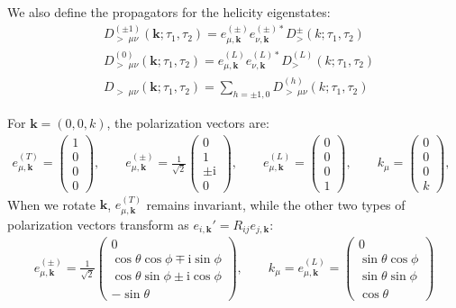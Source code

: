\documentclass[a4paper,12pt]{article}
\def\mb{\mathbf}
\begin{document}
We also define the propagators for the helicity eigenstates:
\begin{align}
    &D_{>\;\mu\nu}^{{(\pm1)}} \left(\mb k ; \tau_{1}, \tau_{2}\right) = e_{\mu,\mb k}^{(\pm) } e_{\nu, \mb k}^{(\pm)*} D_{>}^{\pm} \left(k ; \tau_{1}, \tau_{2}\right) \\
    &D_{>\;\mu\nu}^{{(0)}} \left(\mb k ; \tau_{1}, \tau_{2}\right) =  e_{\mu,\mb k}^{(L)} e_{\nu, \mb k}^{(L)*} D_{>}^{(L)}\left(k ; \tau_{1}, \tau_{2}\right) \\
    &D_{>\;\mu\nu}^{} \left(\mb k ; \tau_{1}, \tau_{2}\right) = \sum_{h=\pm1,0} D_{>\;\mu\nu}^{{(h)}} \left(k ; \tau_{1}, \tau_{2}\right)
\end{align}

For $\mb{k}=(0,0,k)$, the polarization vectors are:
\begin{align}
    e_{\mu,\mathbf{k}}^{(T)} = \begin{pmatrix} 1 \\ 0 \\ 0 \\ 0 \end{pmatrix} , \qquad
    e_{\mu,\mathbf{k}}^{(\pm)} = \frac{1}{\sqrt{2}} \begin{pmatrix} 0 \\ 1 \\ \pm \mathrm{i} \\ 0 \end{pmatrix} , \qquad
    e_{\mu,\mathbf{k}}^{(L)} = \begin{pmatrix} 0 \\ 0 \\ 0 \\ 1 \end{pmatrix}, \qquad
    k_\mu = \begin{pmatrix} 0 \\ 0 \\ 0 \\ k \end{pmatrix}, \qquad
\end{align}
When we rotate $\mb{k}$, $e_{\mu,\mathbf{k}}^{(T)}$ remains invariant, while the other two types of polarization vectors transform as $e_{i,\mathbf{k}}' = R_{ij}e_{j,\mathbf{k}}$:
\begin{align}
    e_{\mu,\mathbf{k}}^{(\pm)} = \frac{1}{\sqrt{2}} \begin{pmatrix} 0 \\ \cos\theta\cos\phi \mp \mathrm{i}\sin\phi \\ \cos\theta\sin\phi \pm \mathrm{i}\cos\phi \\ -\sin\theta \end{pmatrix}, \qquad
    k_\mu = e_{\mu,\mathbf{k}}^{(L)} = \begin{pmatrix} 0 \\ \sin\theta\cos\phi \\ \sin\theta\sin\phi \\ \cos\theta \end{pmatrix}
\end{align}
\end{document}
